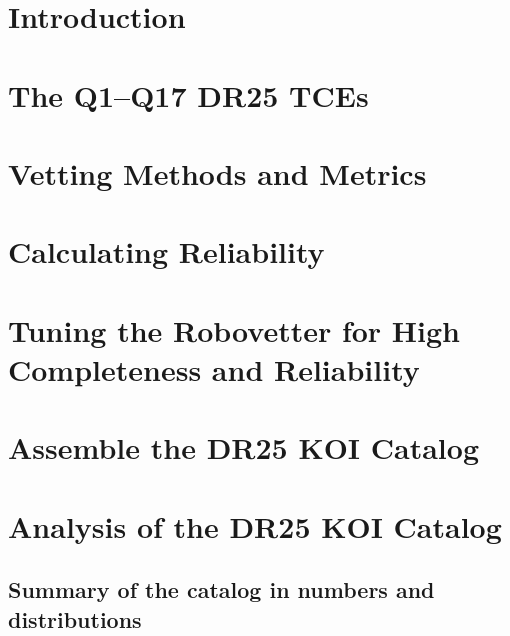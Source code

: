 \documentclass[apj,twocolappendix,numberedappendix]{emulateapj}
\renewcommand{\_}{\discretionary{\underscore}{}{\underscore}}  %
\begin{document}
\begin{abstract}
\end{abstract}


\section{Introduction}



\section{The Q1--Q17 DR25 TCEs}
\label{tcesec}




\section{Vetting Methods and Metrics}


\section{Calculating Reliability}


\section{Tuning the Robovetter for High Completeness and Reliability}



\section{Assemble the DR25 KOI Catalog}



\section{Analysis of the DR25 KOI Catalog}
\subsection{Summary of the catalog in numbers and distributions}

\end{document}
